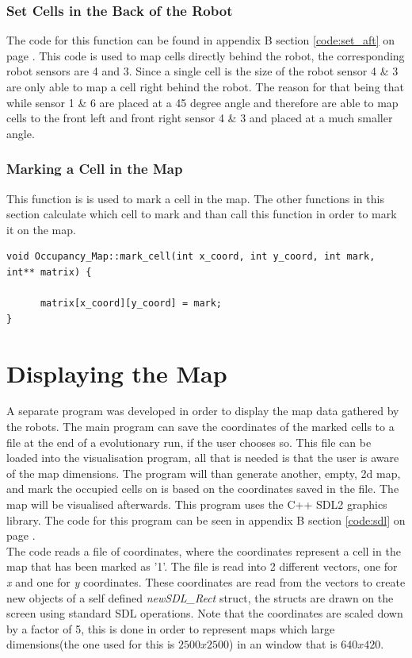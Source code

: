\subsubsection{Set Cells in the Back of the Robot}
The code for this function can be found in appendix B section \ref{code:set_aft} on page \pageref{code:set_aft}. 
This code is used to map cells directly behind the robot, the corresponding robot sensors are 4 and 3. 
Since a single cell is the size of the robot sensor 4 \& 3 are only able to map a cell right behind the robot. The reason for that being that while sensor 1 \& 6 are placed at a 45 degree angle and therefore are able to map cells to the front left and front right sensor 4 \& 3 and placed at a much smaller angle. 

\subsubsection{Marking a Cell in the Map}
This function is is used to mark a cell in the map. The other functions in this section calculate which cell to mark and than call this function in order to mark it on the map.

\begin{lstlisting}[caption = {Mark a cell on the map}]
void Occupancy_Map::mark_cell(int x_coord, int y_coord, int mark, int** matrix) {

      matrix[x_coord][y_coord] = mark;
}
\end{lstlisting}

\section{Displaying the Map}
\label{chap3:sdl}
A separate program was developed in order to display the map data gathered by the robots. The main program can save the coordinates of the marked cells to a file at the end of a evolutionary run, if the user chooses so. 
This file can be loaded into the visualisation program, all that is needed is that the user is aware of the map dimensions. 
The program will than generate another, empty, 2d map, and mark the occupied cells on is based on the coordinates saved in the file. 
The map will be visualised afterwards.
This program uses the C++ SDL2 graphics library. 
The code for this program can be seen in appendix B section \ref{code:sdl} on page \pageref{code:sdl}.\\

The code reads a file of coordinates, where the coordinates represent a cell in the map that has been marked as '1'.
The file is read into 2 different vectors, one for \textit{x} and one for \textit{y} coordinates. These coordinates are read from the vectors to create new objects of a self defined \textit{newSDL\_Rect} struct, the structs are drawn on the screen using standard SDL operations. 
Note that the coordinates are scaled down by a factor of 5, this is done in order to represent maps which large dimensions(the one used for this is $2500 x 2500$) in an window that is $640 x 420$. 


